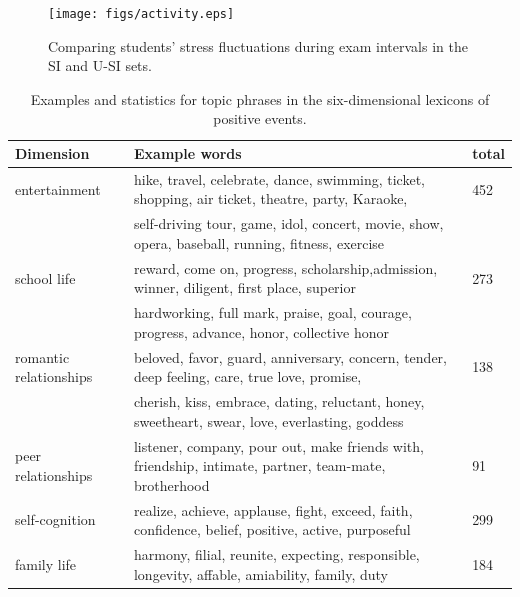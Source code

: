 \begin{figure}[h]
\centering
\texttt{[image: figs/activity.eps]}
\caption{\small{Comparing students' stress fluctuations during exam intervals in the SI and U-SI sets.}}
\label{fig:frequency}
\end{figure} 

\begin{table}
\centering
\caption{\small{Examples and statistics for topic phrases in the six-dimensional lexicons of positive events.}}
\label{tab:topicWords}
\small{
\begin{tabular}{lll}
\toprule
Dimension & Example words & total \\ \midrule
entertainment  & hike, travel, celebrate, dance, swimming, ticket, shopping, air ticket, theatre, party, Karaoke,& 452\\
                      & self-driving tour, game, idol, concert, movie, show, opera, baseball, running, fitness, exercise & \\
school life    & reward, come on, progress, scholarship,admission, winner, diligent, first place, superior & 273\\
				      & hardworking, full mark,  praise, goal, courage, progress, advance, honor, collective honor& \\
romantic  relationships&  beloved, favor, guard, anniversary,  concern, tender, deep feeling, care, true love, promise, & 138\\
				      & cherish, kiss, embrace, dating, reluctant, honey, sweetheart, swear, love, everlasting, goddess &\\
peer relationships  & listener, company, pour out, make friends with, friendship, intimate, partner, team-mate, brotherhood& 91\\
self-cognition & realize, achieve, applause, fight, exceed, faith, confidence, belief, positive, active, purposeful & 299\\
family life    & harmony, filial, reunite, expecting, responsible, longevity, affable, amiability, family, duty & 184\\
\bottomrule
\end{tabular}}
\end{table}
